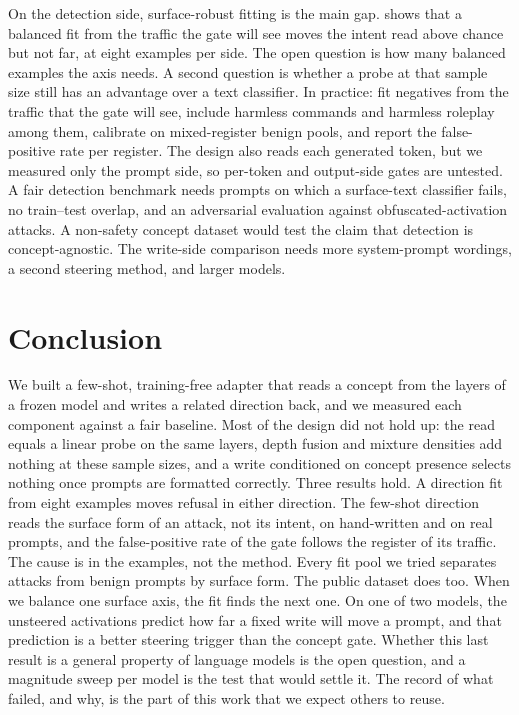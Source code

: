 \documentclass[11pt]{article}
\begin{document}
On the detection side, surface-robust fitting is the main gap.  shows that a balanced
fit from the traffic the gate will see moves the intent read above chance but not far, at eight examples
per side. The open question is how many balanced examples the axis needs. A second question is whether a
probe at that sample size still has an advantage over a text classifier. In practice: fit negatives from the traffic
that the gate will see, include harmless commands and harmless roleplay among them, calibrate on
mixed-register benign pools, and report the false-positive rate per register. The design also reads each
generated token, but we measured only the prompt side, so per-token
and output-side gates are untested. A fair detection benchmark needs prompts on which a surface-text
classifier fails, no train--test overlap, and an adversarial evaluation against obfuscated-activation
attacks. A non-safety concept dataset would test the claim that detection is concept-agnostic. The
write-side comparison needs more system-prompt wordings, a second steering method, and larger models.

\section{Conclusion}
\label{sec:conclusion}

We built a few-shot, training-free adapter that reads a concept from the layers of a frozen model and
writes a related direction back, and we measured each component against a fair baseline. Most of the
design did not hold up: the read equals a linear probe on the same layers, depth fusion and mixture
densities add nothing at these sample sizes, and a write conditioned on concept presence selects nothing
once prompts are formatted correctly. Three results hold. A direction fit from eight examples moves refusal
in either direction. The few-shot direction reads the surface form of an attack, not its intent, on
hand-written and on real prompts, and the false-positive rate of the gate follows the register of its
traffic. The cause is in the examples, not the method. Every fit pool we tried separates attacks from
benign prompts by surface form. The public dataset does too. When we balance one surface axis, the fit
finds the next one. On one of two models, the unsteered activations predict how far a fixed write will move a prompt, and that
prediction is a better steering trigger than the concept gate. Whether this last result is a general
property of language models is the open question, and a magnitude sweep per model is the test that would
settle it. The record of what failed, and why, is the part of this work that we expect others to reuse.
\end{document}
